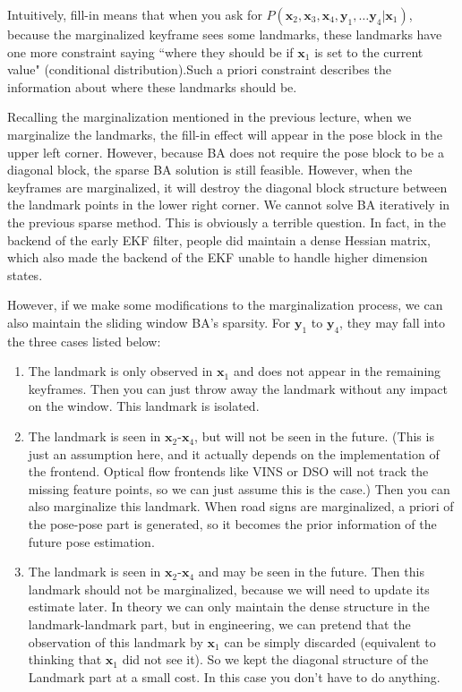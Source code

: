 Intuitively, fill-in means that when you ask for $P(\bm{x}_2, \bm{x}_3, \bm{x}_4, \bm{y}_1, \ldots \bm{y}_4|\bm{x}_1)$, because the marginalized keyframe sees some landmarks, these landmarks have one more constraint saying ``where they should be if $\bm{x}_1$ is set to the current value" (conditional distribution).Such a priori constraint describes the information about where these landmarks should be.

Recalling the marginalization mentioned in the previous lecture, when we marginalize the landmarks, the fill-in effect will appear in the pose block in the upper left corner. However, because BA does not require the pose block to be a diagonal block, the sparse BA solution is still feasible. However, when the keyframes are marginalized, it will destroy the diagonal block structure between the landmark points in the lower right corner. We cannot solve BA iteratively in the previous sparse method. This is obviously a terrible question. In fact, in the backend of the early EKF filter, people did maintain a dense Hessian matrix, which also made the backend of the EKF unable to handle higher dimension states.

However, if we make some modifications to the marginalization process, we can also maintain the sliding window BA's sparsity. For $\bm{y}_1$ to $\bm{y}_4$, they may fall into the three cases listed below:

\begin{enumerate}
	\item The landmark is only observed in $\bm{x}_1$ and does not appear in the remaining keyframes. Then you can just throw away the landmark without any impact on the window. This landmark is isolated.
	\item The landmark is seen in $\bm{x}_2$-$\bm{x}_4$, but will not be seen in the future. (This is just an assumption here, and it actually depends on the implementation of the frontend. Optical flow frontends like VINS \cite{Qin2018} or DSO will not track the missing feature points, so we can just assume this is the case.) Then you can also marginalize this landmark. When road signs are marginalized, a priori of the pose-pose part is generated, so it becomes the prior information of the future pose estimation.
	\item The landmark is seen in $\bm{x}_2$-$\bm{x}_4$ and may be seen in the future. Then this landmark should not be marginalized, because we will need to update its estimate later. In theory we can only maintain the dense structure in the landmark-landmark part, but in engineering, we can pretend that the observation of this landmark by $\bm{x}_1$ can be simply discarded (equivalent to thinking that $\bm{x}_1$ did not see it). So we kept the diagonal structure of the Landmark part at a small cost. In this case you don't have to do anything.	
\end{enumerate}


